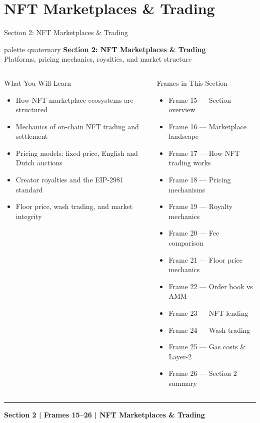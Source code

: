 \documentclass[8pt,aspectratio=169]{beamer}
\newcommand{\bottomnote}[1]{\vfill\vspace{-2mm}\textcolor{mllavender2}{\rule{\textwidth}{0.4pt}}\vspace{1mm}\footnotesize\textbf{#1}}
\begin{document}
\section{NFT Marketplaces \& Trading}

\begin{frame}{Section 2: NFT Marketplaces \& Trading}
\begin{beamercolorbox}[sep=12pt,center,rounded=true,shadow=true]{palette quaternary}
  {\Large\bfseries Section 2: NFT Marketplaces \& Trading}\\[4pt]
  {\normalsize Platforms, pricing mechanics, royalties, and market structure}
\end{beamercolorbox}

\vspace{4mm}
\begin{columns}[T]
\begin{block}{What You Will Learn}
\begin{itemize}\setlength{\itemsep}{2pt}
  \item How NFT marketplace ecosystems are structured
  \item Mechanics of on-chain NFT trading and settlement
  \item Pricing models: fixed price, English and Dutch auctions
  \item Creator royalties and the EIP-2981 standard
  \item Floor price, wash trading, and market integrity
\end{itemize}
\end{block}
\begin{block}{Frames in This Section}
\begin{itemize}\setlength{\itemsep}{1pt}
  \item Frame 15 --- Section overview
  \item Frame 16 --- Marketplace landscape
  \item Frame 17 --- How NFT trading works
  \item Frame 18 --- Pricing mechanisms
  \item Frame 19 --- Royalty mechanics
  \item Frame 20 --- Fee comparison
  \item Frame 21 --- Floor price mechanics
  \item Frame 22 --- Order book vs AMM
  \item Frame 23 --- NFT lending
  \item Frame 24 --- Wash trading
  \item Frame 25 --- Gas costs \& Layer-2
  \item Frame 26 --- Section 2 summary
\end{itemize}
\end{block}
\end{columns}
\bottomnote{Section 2 | Frames 15--26 | NFT Marketplaces \& Trading}
\end{frame}
\end{document}
